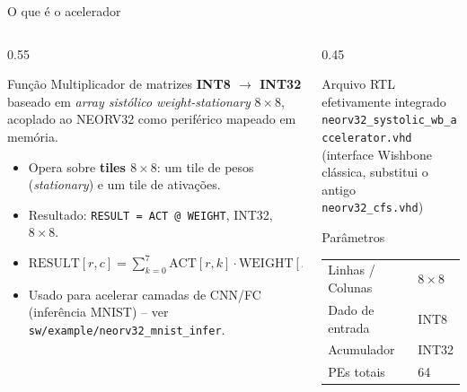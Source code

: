 \documentclass[aspectratio=169,10pt]{beamer}
\begin{document}
\begin{frame}{O que é o acelerador}
  \begin{columns}[T]
    \begin{column}{0.55\textwidth}
      \begin{block}{Função}
        Multiplicador de matrizes \textbf{INT8 $\rightarrow$ INT32} baseado em
        \emph{array sistólico weight-stationary} $8\times8$, acoplado ao
        NEORV32 como periférico mapeado em memória.
      \end{block}
      \vspace{0.3em}
      \begin{itemize}
        \item Opera sobre \textbf{tiles $8\times8$}: um tile de pesos (\emph{stationary})
          e um tile de ativações.
        \item Resultado: \texttt{RESULT = ACT @ WEIGHT}, INT32, $8\times8$.
        \item $\text{RESULT}[r,c] = \sum_{k=0}^{7} \text{ACT}[r,k]\cdot \text{WEIGHT}[k,c]$
        \item Usado para acelerar camadas de CNN/FC (inferência MNIST) --
          ver \texttt{sw/example/neorv32\_mnist\_infer}.
      \end{itemize}
    \end{column}
    \begin{column}{0.45\textwidth}
      \begin{alertblock}{Arquivo RTL efetivamente integrado}
        \texttt{neorv32\_systolic\_wb\_accelerator.vhd}\\
        \small (interface Wishbone clássica, substitui o antigo\\
        \texttt{neorv32\_cfs.vhd})
      \end{alertblock}
      \begin{block}{Parâmetros}
        \begin{tabular}{ll}
          Linhas / Colunas & $8 \times 8$ \\
          Dado de entrada & INT8 \\
          Acumulador & INT32 \\
          PEs totais & 64 \\
        \end{tabular}
      \end{block}
    \end{column}
  \end{columns}
\end{frame}
\end{document}
